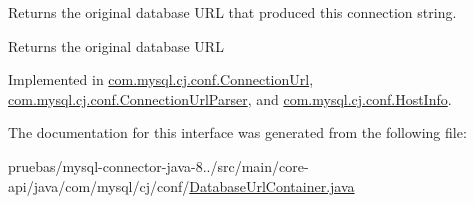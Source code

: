 Returns the original database U\+RL that produced this connection string.

\begin{DoxyReturn}{Returns}
the original database U\+RL 
\end{DoxyReturn}


Implemented in \mbox{\hyperlink{classcom_1_1mysql_1_1cj_1_1conf_1_1_connection_url_a574945f907f1b2aadd0f056e0e240bbf}{com.\+mysql.\+cj.\+conf.\+Connection\+Url}}, \mbox{\hyperlink{classcom_1_1mysql_1_1cj_1_1conf_1_1_connection_url_parser_af08f3c184e60422f883d7400e326e3e1}{com.\+mysql.\+cj.\+conf.\+Connection\+Url\+Parser}}, and \mbox{\hyperlink{classcom_1_1mysql_1_1cj_1_1conf_1_1_host_info_a84c5d1cc48b3d5d1d9911513777f9152}{com.\+mysql.\+cj.\+conf.\+Host\+Info}}.



The documentation for this interface was generated from the following file\+:\begin{DoxyCompactItemize}
\item 
pruebas/mysql-\/connector-\/java-\/8../src/main/core-\/api/java/com/mysql/cj/conf/\mbox{\hyperlink{_database_url_container_8java}{Database\+Url\+Container.\+java}}\end{DoxyCompactItemize}
